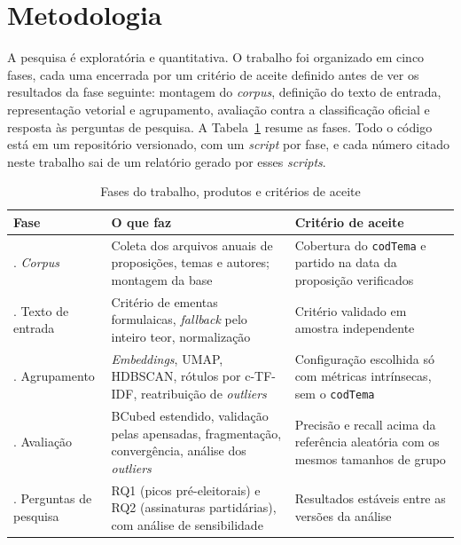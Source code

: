 
\section{Metodologia}
\label{sec:metodologia}

A pesquisa é exploratória e quantitativa. O trabalho foi organizado em cinco fases, cada uma encerrada por um critério de aceite definido antes de ver os resultados da fase seguinte: montagem do \textit{corpus}, definição do texto de entrada, representação vetorial e agrupamento, avaliação contra a classificação oficial e resposta às perguntas de pesquisa. A Tabela~\ref{tab:fases} resume as fases. Todo o código está em um repositório versionado, com um \textit{script} por fase, e cada número citado neste trabalho sai de um relatório gerado por esses \textit{scripts}.

\begin{table}[H]
\centering
\caption{Fases do trabalho, produtos e critérios de aceite}
\label{tab:fases}
\small
\begin{tabularx}{\textwidth}{>{\raggedright\arraybackslash}p{3.2cm} >{\raggedright\arraybackslash}X >{\raggedright\arraybackslash}p{4.6cm}}
\toprule
\textbf{Fase} & \textbf{O que faz} & \textbf{Critério de aceite} \\
\midrule
1. \textit{Corpus} & Coleta dos arquivos anuais de proposições, temas e autores; montagem da base & Cobertura do \texttt{codTema} e partido na data da proposição verificados \\
\addlinespace
2. Texto de entrada & Critério de ementas formulaicas, \textit{fallback} pelo inteiro teor, normalização & Critério validado em amostra independente \\
\addlinespace
3. Agrupamento & \textit{Embeddings}, UMAP, HDBSCAN, rótulos por c-TF-IDF, reatribuição de \textit{outliers} & Configuração escolhida só com métricas intrínsecas, sem o \texttt{codTema} \\
\addlinespace
4. Avaliação & BCubed estendido, validação pelas apensadas, fragmentação, convergência, análise dos \textit{outliers} & Precisão e recall acima da referência aleatória com os mesmos tamanhos de grupo \\
\addlinespace
5. Perguntas de pesquisa & RQ1 (picos pré-eleitorais) e RQ2 (assinaturas partidárias), com análise de sensibilidade & Resultados estáveis entre as versões da análise \\
\bottomrule
\end{tabularx}
\end{table}

